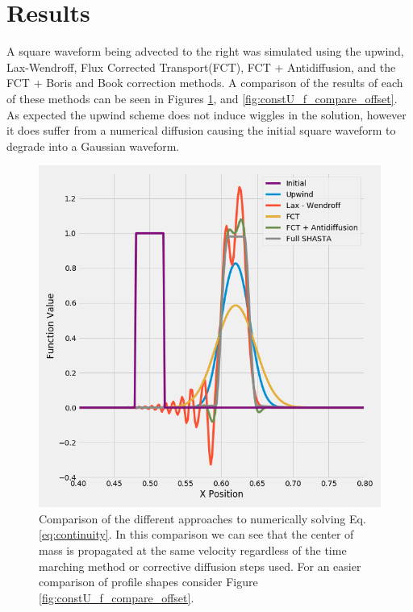 \documentclass[]{article}
\begin{document}
\section{Results}
A square waveform being advected to the right was simulated using the upwind, Lax-Wendroff, Flux Corrected Transport(FCT), FCT + Antidiffusion, and the FCT + Boris and Book correction methods. A comparison of the results of each of these methods can be seen in Figures \ref{fig:constU_f_compare}, and \ref{fig:constU_f_compare_offset}. As expected the upwind scheme does not induce wiggles in the solution, however it does suffer from a numerical diffusion causing the initial square waveform to degrade into a Gaussian waveform. 


\begin{figure}
		\centering
		\includegraphics[width=.8\linewidth]{figures/constU_fCompare.png}

	\caption{Comparison of the different approaches to numerically solving Eq. \ref{eq:continuity}. In this comparison we can see that the center of mass is propagated at the same velocity regardless of the time marching method or corrective diffusion steps used. For an easier comparison of profile shapes consider Figure \ref{fig:constU_f_compare_offset}. }
	\label{fig:constU_f_compare}
\end{figure}
\end{document}
